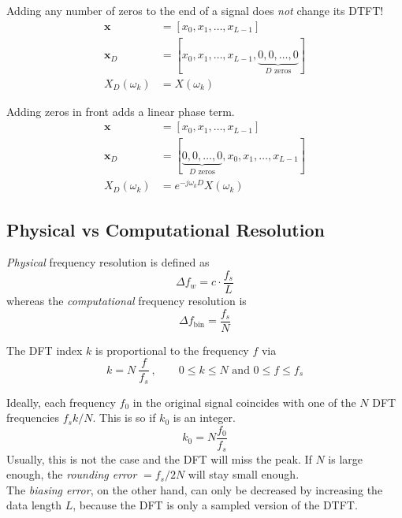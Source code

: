 Adding any number of zeros to the end of a signal does \emph{not} change its DTFT!
\begin{align*}
	\mathbf{x} &= [x_0,x_1,\ldots,x_{L-1}] \\
	\mathbf{x}_D &= [x_0,x_1,\ldots,x_{L-1},\underbrace{0,0,\ldots,0}_{D \text{ zeros}}] \\
	X_D(\omega_k) &= X(\omega_k)
\end{align*}

Adding zeros in front adds a linear phase term.
\begin{align*}
	\mathbf{x} &= [x_0,x_1,\ldots,x_{L-1}] \\
	\mathbf{x}_D &= [\underbrace{0,0,\ldots,0}_{D \text{ zeros}},x_0,x_1,\ldots,x_{L-1}] \\
	X_D(\omega_k) &= e^{-j \omega_k D} X(\omega_k)
\end{align*}

\subsection{Physical vs Computational Resolution}

\emph{Physical} frequency resolution is defined as
\begin{equation*}
	\Delta f_w = c \cdot \frac{f_s}{L}
\end{equation*}
whereas the \emph{computational} frequency resolution is
\begin{equation*}
	\Delta f_{\text{bin}} = \frac{f_s}{N}
\end{equation*}

The DFT index $k$ is proportional to the frequency $f$ via
\begin{equation*}
	k = N\:\frac{f}{f_s}\:, \qquad 0\leq k \leq N \text{ and } 0 \leq f \leq f_s
\end{equation*}

Ideally, each frequency $f_0$ in the original signal coincides with one
of the $N$ DFT frequencies $f_s k / N$. This is so if $k_0$ is an integer.
\begin{equation*}
	k_0 = N \frac{f_0}{f_s}
\end{equation*}
Usually, this is not the case and the DFT will miss the peak. If $N$ is large
enough, the \emph{rounding error} $= f_s / 2N$ will stay small enough. \\

The \emph{biasing error}, on the other hand, can only be decreased by
increasing the data length $L$, because the DFT is only a sampled version
of the DTFT.


